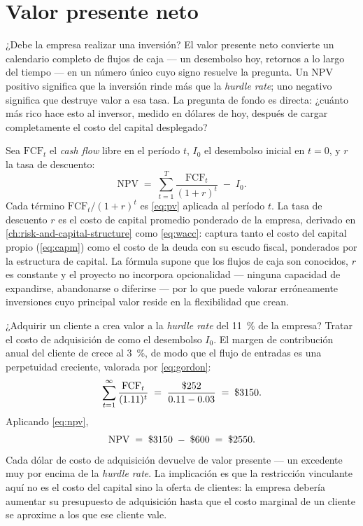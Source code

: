 \section{Valor presente neto}\label{sec:net-present-value}

¿Debe la empresa realizar una inversión? El valor presente neto convierte un calendario
completo de flujos de caja --- un desembolso hoy, retornos a lo largo del tiempo --- en un
número único cuyo signo resuelve la pregunta. Un NPV positivo significa que la inversión rinde
más que la \emph{hurdle rate}; uno negativo significa que destruye valor a esa tasa. La
pregunta de fondo es directa: ¿cuánto más rico hace esto al inversor, medido en dólares de hoy,
después de cargar completamente el costo del capital desplegado?

Sea \(\mathrm{FCF}_t\) el \emph{cash flow} libre en el período \(t\), \(I_0\) el desembolso
inicial en \(t=0\), y \(r\) la tasa de descuento:
\begin{equation}\label{eq:npv}
  \mathrm{NPV} \;=\; \sum_{t=1}^{T}\frac{\mathrm{FCF}_t}{(1+r)^{t}} \;-\; I_0.
\end{equation}
Cada término \(\mathrm{FCF}_t/(1+r)^t\) es \cref{eq:pv} aplicada al período \(t\). La tasa de
descuento \(r\) es el costo de capital promedio ponderado de la empresa, derivado en
\cref{ch:risk-and-capital-structure} como \cref{eq:wacc}: captura tanto el costo del capital
propio (\cref{eq:capm}) como el costo de la deuda con su escudo fiscal, ponderados por la
estructura de capital. La fórmula supone que los flujos de caja son conocidos, \(r\) es
constante y el proyecto no incorpora opcionalidad --- ninguna capacidad de expandirse, abandonarse
o diferirse --- por lo que puede valorar erróneamente inversiones cuyo principal valor reside en
la flexibilidad que crean.

\begin{example}
¿Adquirir un cliente a  crea valor a la \emph{hurdle rate} del \qty{11}{\percent} de la
empresa? Tratar el costo de adquisición de  como el desembolso \(I_0\). El margen de
contribución anual del cliente de  crece al \qty{3}{\percent}, de modo que el flujo de
entradas es una perpetuidad creciente, valorada por \cref{eq:gordon}:
\[
  \sum_{t=1}^{\infty}\frac{\mathrm{FCF}_t}{(1.11)^t}
  \;=\; \frac{\$\num{252}}{0.11-0.03}
  \;=\; \$\num{3150}.
\]
Aplicando \cref{eq:npv},
\[
  \mathrm{NPV} \;=\; \$\num{3150} \;-\; \$\num{600} \;=\; \$\num{2550}.
\]
Cada dólar de costo de adquisición devuelve  de valor presente --- un excedente muy
por encima de la \emph{hurdle rate}. La implicación es que la restricción vinculante aquí no es
el costo del capital sino la oferta de clientes: la empresa debería aumentar su presupuesto de
adquisición hasta que el costo marginal de un cliente se aproxime a los  que ese
cliente vale.
\end{example}

